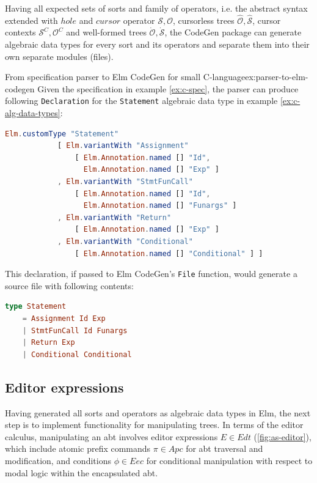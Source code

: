 Having all expected sets of sorts and family of operators,
i.e. the abstract syntax extended with $hole$ and $cursor$ operator $\mathcal{S},
  \mathcal{O}$, cursorless trees $\hat{\mathcal{O}},\hat{\mathcal{S}}$,
cursor contexts $\mathcal{S}^C,\mathcal{O}^C$ and
well-formed trees $\dot{\mathcal{O}},\dot{\mathcal{S}}$,
the CodeGen package can generate algebraic data types for every sort and its operators
and separate them into their own separate modules (files).

\begin{example}{From specification parser to Elm CodeGen for small C-language}{ex:parser-to-elm-codegen}
  Given the specification in example \cref{ex:c-spec}, the parser can produce following \texttt{Declaration} for the \texttt{Statement} algebraic data type in example \cref{ex:c-alg-data-types}:
  \begin{lstlisting}[backgroundcolor=\color{myexamplecolorback},language=elm]
Elm.customType "Statement"
            [ Elm.variantWith "Assignment" 
                [ Elm.Annotation.named [] "Id", 
                  Elm.Annotation.named [] "Exp" ]
            , Elm.variantWith "StmtFunCall" 
                [ Elm.Annotation.named [] "Id", 
                  Elm.Annotation.named [] "Funargs" ]
            , Elm.variantWith "Return" 
                [ Elm.Annotation.named [] "Exp" ]
            , Elm.variantWith "Conditional" 
                [ Elm.Annotation.named [] "Conditional" ] ]
\end{lstlisting}

  This declaration, if passed to Elm CodeGen's \texttt{File} function, would generate a source file with following contents:
  \begin{lstlisting}[backgroundcolor=\color{myexamplecolorback},language=elm]
type Statement
    = Assignment Id Exp
    | StmtFunCall Id Funargs
    | Return Exp
    | Conditional Conditional
\end{lstlisting}
\end{example}

\subsection{Editor expressions}

Having generated all sorts and operators as algebraic data types in Elm,
the next step is to implement functionality for manipulating trees.
In terms of the editor calculus\cite{aalborg},
manipulating an abt involves editor expressions $E \in Edt$ (\cref{fig:as-editor}),
which include atomic prefix commands $\pi \in Apc$ for abt traversal
and modification, and conditions $\phi \in Eec$ for conditional manipulation with
respect to modal logic within the encapsulated abt.

